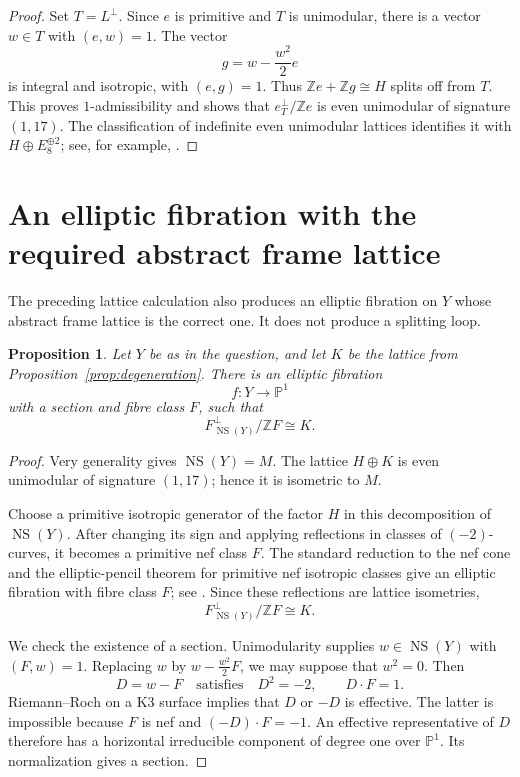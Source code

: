 \documentclass[11pt]{amsart}
\newcommand{\Z}{\mathbb Z}
\newcommand{\NS}{\operatorname{NS}}
\newtheorem{proposition}[lemma]{Proposition}
\theoremstyle{remark}
\begin{document}
\begin{proof}
Set \(T=L^\perp\).
Since \(e\) is primitive and \(T\) is unimodular, there is a vector
\(w\in T\) with \((e,w)=1\).
The vector
\[
 g=w-\frac{w^2}{2}e
\]
is integral and isotropic, with \((e,g)=1\).
Thus \(\Z e+\Z g\cong H\) splits off from \(T\).
This proves \(1\)-admissibility and shows that
\(e^\perp_T/\Z e\) is even unimodular of signature \((1,17)\).
The classification of indefinite even unimodular lattices identifies
it with \(H\oplus E_8^{\oplus2}\); see, for example,
\cite[Section~1.14]{Nik80}.
\end{proof}

\section{An elliptic fibration with the required abstract frame lattice}

The preceding lattice calculation also produces an elliptic fibration
on \(Y\) whose abstract frame lattice is the correct one.
It does not produce a splitting loop.

\begin{proposition}\label{prop:fibration}
Let \(Y\) be as in the question, and let \(K\) be the lattice from
Proposition~\ref{prop:degeneration}.
There is an elliptic fibration
\[
 f:Y\longrightarrow\mathbb P^1
\]
with a section and fibre class \(F\), such that
\[
 F^\perp_{\NS(Y)}/\Z F\cong K.
\]
\end{proposition}

\begin{proof}
Very generality gives \(\NS(Y)=M\).
The lattice \(H\oplus K\) is even unimodular of signature \((1,17)\);
hence it is isometric to \(M\).

Choose a primitive isotropic generator of the factor \(H\) in this
decomposition of \(\NS(Y)\).
After changing its sign and applying reflections in classes of
\((-2)\)-curves, it becomes a primitive nef class \(F\).
The standard reduction to the nef cone and the elliptic-pencil
theorem for primitive nef isotropic classes give an elliptic
fibration with fibre class \(F\); see
\cite[Chapter~8, Section~2, and Chapter~11, Section~1]{Huy16}.
Since these reflections are lattice isometries,
\[
 F^\perp_{\NS(Y)}/\Z F\cong K.
\]

We check the existence of a section.
Unimodularity supplies \(w\in\NS(Y)\) with \((F,w)=1\).
Replacing \(w\) by \(w-\frac{w^2}{2}F\), we may suppose that \(w^2=0\).
Then
\[
 D=w-F
 \quad\text{satisfies}\quad
 D^2=-2,\qquad D\cdot F=1.
\]
Riemann--Roch on a K3 surface implies that \(D\) or \(-D\) is effective.
The latter is impossible because \(F\) is nef and
\((-D)\cdot F=-1\).
An effective representative of \(D\) therefore has a horizontal
irreducible component of degree one over \(\mathbb P^1\).
Its normalization gives a section.
\end{proof}
\end{document}
